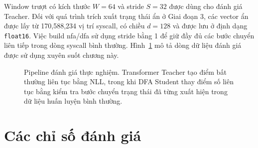 \documentclass[../main.tex]{subfiles}
\begin{document}
Window trượt có kích thước $W = 64$ và stride $S = 32$ được dùng cho
đánh giá Teacher.
Đối với quá trình trích xuất trạng thái ẩn ở Giai đoạn 3, các vector
ẩn được lấy từ
170,588,234 vị trí \gls{syscall}, có chiều $d = 128$ và được lưu ở định
dạng \texttt{float16}.
Việc build \gls{nfa}/\gls{dfa} sử dụng stride bằng 1 để giữ đầy đủ các bước
chuyển liên tiếp trong
dòng \gls{syscall} bình thường. Hình~\ref{fig:eval_pipeline} mô tả dòng dữ
liệu đánh giá được
sử dụng xuyên suốt chương này.

\begin{figure}[H]
  \centering
  \caption{Pipeline đánh giá thực nghiệm. Transformer Teacher tạo
    điểm bất thường
    liên tục bằng NLL, trong khi DFA Student thay điểm số liên tục
    bằng kiểm tra bước
  chuyển trạng thái đã từng xuất hiện trong dữ liệu huấn luyện bình thường.}
  \label{fig:eval_pipeline}
\end{figure}

\section{Các chỉ số đánh giá}
\label{sec:eval_metrics}
\end{document}
